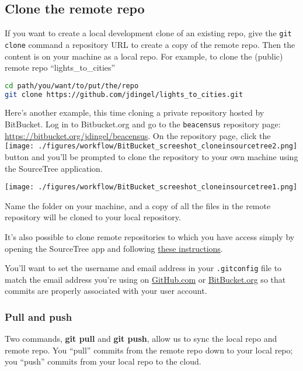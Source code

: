 \subsection{Clone the remote repo}

If you want to create a local development clone of an existing repo,
give the \texttt{git clone} command a repository URL to create a copy of the remote repo.
Then the content is on your machine as a local repo.
For example, to clone the (public) remote repo ``lights\_to\_cities''
\begin{lstlisting}[language=bash]
cd path/you/want/to/put/the/repo
git clone https://github.com/jdingel/lights_to_cities.git
\end{lstlisting}

Here's another example, this time cloning a private repository hosted by BitBucket.
Log in to Bitbucket.org and go to the \texttt{beacensus} repository page:
\url{https://bitbucket.org/jdingel/beacensus}.
On the repository page, click the
\texttt{[image: ./figures/workflow/BitBucket\_screeshot\_cloneinsourcetree2.png]}
button and you'll be prompted to clone the repository to your own machine using the SourceTree application.
\begin{center}
\texttt{[image: ./figures/workflow/BitBucket\_screeshot\_cloneinsourcetree1.png]}
\end{center}
Name the folder on your machine, and a copy of all the files in the remote repository will be cloned to your local repository.

It's also possible to clone remote repositories to which you have access simply by opening the SourceTree app and following \href{https://confluence.atlassian.com/get-started-with-sourcetree/clone-a-remote-repository-847359098.html}{these instructions}.

You'll want to set the username and email address in your \texttt{.gitconfig} file
to match the email address you're using on \href{http://www.github.com}{GitHub.com} or \href{http://www.bitbucket.org}{BitBucket.org}
so that commits are properly associated with your user account.

\subsubsection{Pull and push}

Two commands, \textbf{git pull} and \textbf{git push},
allow us to sync the local repo and remote repo.
You ``pull'' commits from the remote repo down to your local repo;
you ``push'' commits from your local repo to the cloud.

